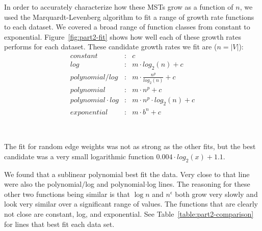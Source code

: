 In order to accurately characterize how these MSTs grow as a function of $n$, we
used the Marquardt-Levenberg algorithm to fit a range of growth rate functions
to each dataset.  We covered a broad range of function classes from constant to
exponential.  Figure~\ref{fig:part2-fit} shows how well each of these growth
rates performs for each dataset.  These candidate growth rates we fit are ($n =
|V|$):
\begin{eqnarray*}
constant&:& c \\
log&:& m \cdot log_2(n) + c \\
polynomial / log&:& m \cdot \frac{n^p}{log_2(n)} + c \\
polynomial&:& m \cdot n^p + c \\
polynomial \cdot log&:& m \cdot n^p \cdot log_2(n) + c \\
exponential&:& m \cdot b^n + c
\end{eqnarray*}

\begin{figure*}[htb!]
\centering
\mbox{
\quad
{}
}
\mbox{
\quad
{}
}
\caption{Comparison of best-fit lines to empirical data.}
\label{fig:part2-fit}
\end{figure*}

The fit for random edge weights was not as strong as the other fits, but the
best candidate was a very small logarithmic function $0.004 \cdot log_2(x) + 1.1$.

We found that a sublinear polynomial best fit the data. Very close to that line
were also the polynomial$/$log and polynomial$\cdot$log lines. The reasoning for
these other two functions being similar is that $\log n$ and $n^\epsilon$ both
grow very slowly and look very similar over a significant range of values. The
functions that are clearly not close are constant, log, and exponential.  See
Table~\ref{table:part2-comparison} for lines that best fit each data set.

